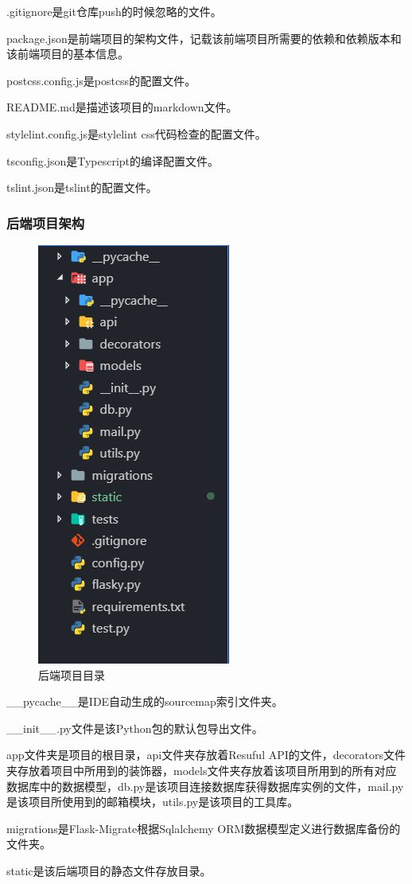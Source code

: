 .gitignore是git仓库push的时候忽略的文件。

package.json是前端项目的架构文件，记载该前端项目所需要的依赖和依赖版本和该前端项目的基本信息。

postcss.config.js是postcss的配置文件。

README.md是描述该项目的markdown文件。

stylelint.config.js是stylelint css代码检查的配置文件。

tsconfig.json是Typescript的编译配置文件。

tslint.json是tslint的配置文件。

\subsubsection{后端项目架构}
\begin{figure}[thbp!]
	\centering
	\includegraphics[width=0.3\linewidth]{figure/backend_structure}
	\caption{后端项目目录}
	\label{fig:backend_structure}
\end{figure}

\_\_pycache\_\_是IDE自动生成的sourcemap索引文件夹。

\_\_init\_\_.py文件是该Python包的默认包导出文件。

app文件夹是项目的根目录，api文件夹存放着Resuful API的文件，decorators文件夹存放着项目中所用到的装饰器，models文件夹存放着该项目所用到的所有对应数据库中的数据模型，db.py是该项目连接数据库获得数据库实例的文件，mail.py是该项目所使用到的邮箱模块，utils.py是该项目的工具库。

migrations是Flask-Migrate根据Sqlalchemy ORM数据模型定义进行数据库备份的文件夹。

static是该后端项目的静态文件存放目录。

